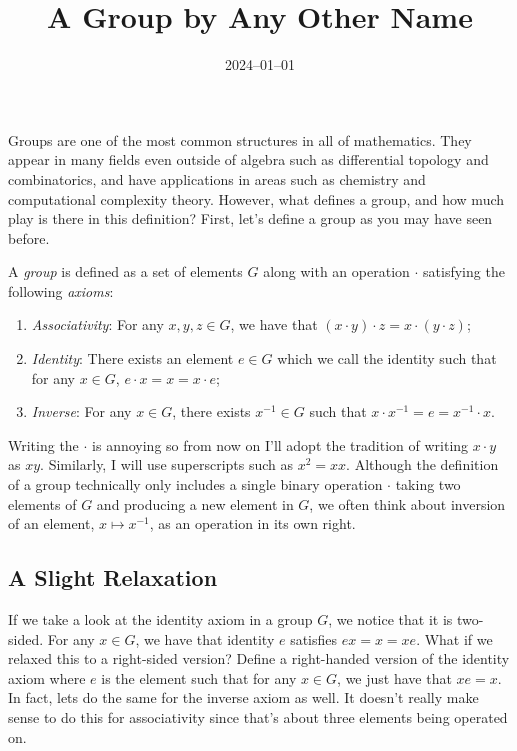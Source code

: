 \documentclass{article}
\title{A Group by Any \newline Other Name}
\date{2024--01--01}
\begin{document}
\maketitle

Groups are one of the most common structures in all of mathematics.
They appear in many fields even outside of algebra such as differential topology and combinatorics, and have applications in areas such as chemistry and computational complexity theory.
However, what defines a group, and how much play is there in this definition?
First, let's define a group as you may have seen before.

\begin{defn}\label{defn:grp}
  A \emph{group} is defined as a set of elements $G$ along with an operation $\cdot$ satisfying the following \emph{axioms}:
  \begin{enumerate}
  \item \emph{Associativity}: For any $x, y, z \in G$, we have that $(x \cdot y) \cdot z = x \cdot (y \cdot z)$;
  \item \emph{Identity}: There exists an element $e \in G$ which we call the identity such that for any $x \in G$, $e \cdot x = x = x \cdot e$;
  \item \emph{Inverse}: For any $x \in G$, there exists $x^{-1} \in G$ such that $x \cdot x^{-1} = e = x^{-1} \cdot x$.
  \end{enumerate}
\end{defn}

Writing the $\cdot$ is annoying so from now on I'll adopt the tradition of writing $x \cdot y$ as $xy$.
Similarly, I will use superscripts such as $x^{2} = xx$.
Although the definition of a group technically only includes a single binary operation $\cdot$ taking two elements of $G$ and producing a new element in $G$, we often think about inversion of an element, $x \mapsto x^{-1}$, as an operation in its own right.

\subsection*{A Slight Relaxation}

If we take a look at the identity axiom in a group $G$, we notice that it is two-sided.
For any $x \in G$, we have that identity $e$ satisfies $ex = x = xe$.
What if we relaxed this to a right-sided version?
Define a right-handed version of the identity axiom where $e$ is the element such that for any $x \in G$, we just have that $xe = x$.
In fact, lets do the same for the inverse axiom as well.
It doesn't really make sense to do this for associativity since that's about three elements being operated on.
\end{document}

